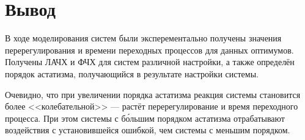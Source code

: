     \section{Вывод}
        В ходе моделирования систем были эксперементально получены значения перерегулирования и времени переходных процессов для данных оптимумов. Получены ЛАЧХ и ФЧХ для систем различной настройки, а также определён порядок астатизма, получающийся в результате настройки системы.
        
        Очевидно, что при увеличении порядка астатизма реакция системы становится более <<колебательной>> --- растёт перерегулирование и время переходного процесса. При этом системы с б\'{о}льшим порядком астатизма отрабатывают воздействия с установившейся ошибкой, чем системы с меньшим порядком.

